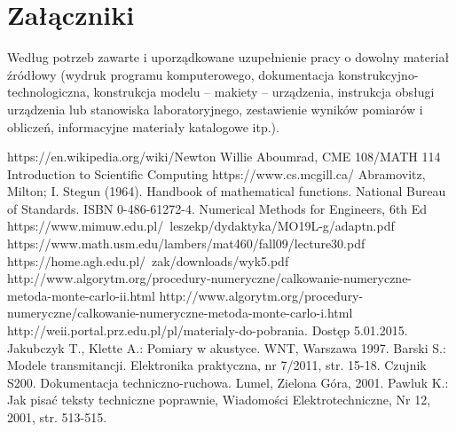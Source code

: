 \documentclass[12pt,twoside]{article}
\begin{document}
\section*{Załączniki}

Według potrzeb zawarte i uporządkowane uzupełnienie pracy o dowolny materiał źródłowy (wydruk programu komputerowego, dokumentacja kons\-truk\-cyj\-no-\-tech\-no\-lo\-gicz\-na, konstrukcja modelu -- makiety -- urządzenia, instrukcja obsługi urządzenia lub stanowiska laboratoryjnego, zestawienie wyników pomiarów i obliczeń, informacyjne materiały katalogowe itp.).


\clearpage


\begin{thebibliography}{4}
 https://en.wikipedia.org/wiki/Newton%
 Willie Aboumrad, CME 108/MATH 114 Introduction to Scientific Computing
 https://www.cs.mcgill.ca/
 Abramovitz, Milton; I. Stegun (1964). Handbook of mathematical functions. National Bureau of Standards. ISBN 0-486-61272-4.
 Numerical Methods for Engineers, 6th Ed
 https://www.mimuw.edu.pl/~leszekp/dydaktyka/MO19L-g/adaptn.pdf
 https://www.math.usm.edu/lambers/mat460/fall09/lecture30.pdf
 https://home.agh.edu.pl/~zak/downloads/wyk5.pdf
 http://www.algorytm.org/procedury-numeryczne/calkowanie-numeryczne-metoda-monte-carlo-ii.html
 http://www.algorytm.org/procedury-numeryczne/calkowanie-numeryczne-metoda-monte-carlo-i.html
 http://weii.portal.prz.edu.pl/pl/materialy-do-pobrania. Dostęp 5.01.2015.
 Jakubczyk T., Klette A.: Pomiary w akustyce. WNT, Warszawa 1997.
 Barski S.: Modele transmitancji. Elektronika praktyczna, nr 7/2011, str. 15-18.
 Czujnik S200. Dokumentacja techniczno-ruchowa. Lumel, Zielona Góra, 2001.
 Pawluk K.: Jak pisać teksty techniczne poprawnie, Wiadomości Elektrotechniczne, Nr 12, 2001, str. 513-515.
\end{thebibliography}

\clearpage

\makesummary
\end{document}
